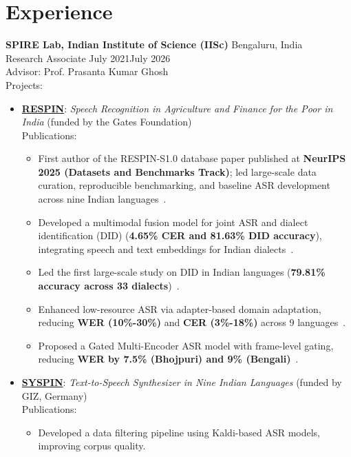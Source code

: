 \documentclass[letterpaper,11pt]{article}
\begin{document}
\section{Experience}
\textbf{SPIRE Lab, Indian Institute of Science (IISc)} \hfill Bengaluru, India\\
Research Associate \hfill July 2021\textendash July 2026 \\
Advisor: Prof. Prasanta Kumar Ghosh \\
Projects:
\begin{itemize}
  \item \href{https://respin.iisc.ac.in/}{\textbf{RESPIN}}: \textit{Speech Recognition in Agriculture and Finance for the Poor in India} (funded by the Gates Foundation) \\
  Publications: \cite{kumar2025respins, ASRU25_MADASR2, Saurabh_IS25, ICASSP25_DID, IS24_ASR, ASRU23_RESPIN}
  \begin{itemize}
    \item First author of the RESPIN-S1.0 database paper published at \textbf{NeurIPS 2025 (Datasets and Benchmarks Track)}; led large-scale data curation, reproducible benchmarking, and baseline ASR development across nine Indian languages~\cite{kumar2025respins}.
    
    \item Developed a multimodal fusion model for joint ASR and dialect identification (DID) (\textbf{4.65\% CER and 81.63\% DID accuracy}), integrating speech and text embeddings for Indian dialects~\cite{Saurabh_IS25}.
    
    \item Led the first large-scale study on DID in Indian languages (\textbf{79.81\% accuracy across 33 dialects})~\cite{ICASSP25_DID}.
    
    \item Enhanced low-resource ASR via adapter-based domain adaptation, reducing \textbf{WER (10\%-30\%)} and \textbf{CER (3\%-18\%)} across 9 languages~\cite{IS24_ASR}.
    
    \item Proposed a Gated Multi-Encoder ASR model with frame-level gating, reducing \textbf{WER by 7.5\% (Bhojpuri) and 9\% (Bengali)}~\cite{ASRU23_RESPIN}.
  \end{itemize}

  \item \href{https://syspin.iisc.ac.in/}{\textbf{SYSPIN}}: \textit{Text-to-Speech Synthesizer in Nine Indian Languages} (funded by GIZ, Germany) \\
  Publications: \cite{LIMMITS24_OJSP2025}
  \begin{itemize}
    \item Developed a data filtering pipeline using Kaldi-based ASR models, improving corpus quality.
  \end{itemize}
\end{itemize}
\end{document}
